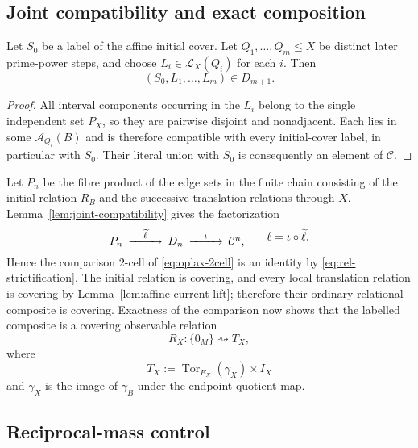 \subsection{Joint compatibility and exact composition}

\begin{lemma}\label{lem:joint-compatibility}
Let $S_0$ be a label of the affine initial cover.  Let $Q_1,\ldots,Q_m\le X$ be distinct later prime-power steps, and choose $L_i\in\mathscr L_X(Q_i)$ for each $i$.  Then
\[
(S_0,L_1,\ldots,L_m)\in D_{m+1}.
\]
\end{lemma}

\begin{proof}
All interval components occurring in the $L_i$ belong to the single independent set $P_X$, so they are pairwise disjoint and nonadjacent.  Each lies in some $\mathcal A_{Q_i}(B)$ and is therefore compatible with every initial-cover label, in particular with $S_0$.  Their literal union with $S_0$ is consequently an element of $\mathcal C$.
\end{proof}

Let $P_n$ be the fibre product of the edge sets in the finite chain consisting of the initial relation $R_B$ and the successive translation relations through $X$.  Lemma~\ref{lem:joint-compatibility} gives the factorization
\begin{equation}\label{eq:realization-factorization}
\begin{CD}
P_n @>{\widetilde\ell}>> D_n @>{\iota}>> \mathcal C^n,
\end{CD}
\qquad
\ell=\iota\circ\widetilde\ell.
\end{equation}
Hence the comparison $2$-cell of \eqref{eq:oplax-2cell} is an identity by \eqref{eq:rel-strictification}.  The initial relation is covering, and every local translation relation is covering by Lemma~\ref{lem:affine-current-lift}; therefore their ordinary relational composite is covering.  Exactness of the comparison now shows that the labelled composite is a covering observable relation
\[
R_X:\{0_M\}\rightsquigarrow T_X,
\]
where
\begin{equation}\label{eq:finite-response}
T_X:=\operatorname{Tor}_{E_X}(\gamma_X)\times I_X
\end{equation}
and $\gamma_X$ is the image of $\gamma_B$ under the endpoint quotient map.

\subsection{Reciprocal-mass control}

